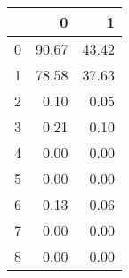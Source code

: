 \begin{tabular}{lrr}
\toprule
{} &      0 &      1 \\
\midrule
0 &  90.67 &  43.42 \\
1 &  78.58 &  37.63 \\
2 &   0.10 &   0.05 \\
3 &   0.21 &   0.10 \\
4 &   0.00 &   0.00 \\
5 &   0.00 &   0.00 \\
6 &   0.13 &   0.06 \\
7 &   0.00 &   0.00 \\
8 &   0.00 &   0.00 \\
\bottomrule
\end{tabular}
